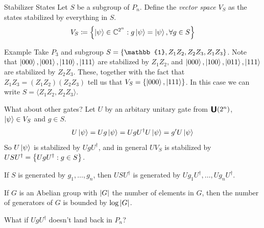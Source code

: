 \documentclass[11pt,aspectratio=1610]{beamer}
\newcommand{\unitary}[1]{\raisebox{-1pt}{\scalebox{1.2}{$\bm{\mathsf{U}}$}}\qty(#1)}
\begin{document}
\begin{frame}{Stabilizer States}
	Let $S$ be a subgroup of $P_n$. Define the \emph{vector space} $V_S$ as the states stabilized by everything in $S$.
	\begin{equation*}
		V_S\coloneqq \qty{\ket{\psi}\in\mathbb{C}^{2^n}: g\ket{\psi} = \ket{\psi}, \forall g\in S}
	\end{equation*}
	\begin{exampleblock}{Example}
		Take $P_3$ and subgroup $S = \qty{\mathbb{1}, Z_1Z_2, Z_2Z_3, Z_1Z_3}$. Note that $\ket{000}, \ket{001}, \ket{110}, \ket{111}$ are stabilized by $Z_1Z_2$, and $\ket{000}, \ket{100}, \ket{011}, \ket{111}$ are stabilized by $Z_2Z_3$. These, together with the fact that $Z_1Z_3 = (Z_1Z_2)(Z_2Z_3)$ tell us that $V_S = \qty{\ket{000}, \ket{111}}$. In this case we can write $S = \langle Z_1Z_2, Z_2Z_3\rangle$.
	\end{exampleblock}
\end{frame}

\begin{frame}[t]{What about other gates?}
	Let $U$ by an arbitary unitary gate from $\unitary{2^n}$, $\ket{\psi}\in V_S$ and $g\in S$.\pause
	\begin{equation*}
		U\ket{\psi} = Ug\ket{\psi} = UgU^\dagger U\ket{\psi} = g'U\ket{\psi}
	\end{equation*}\pause
	So $U\ket{\psi}$ is stabilized by $UgU^\dagger$, and in general $UV_S$ is stabilized by $USU^\dagger = \qty{UgU^\dagger : g\in S}$.

	\begin{corollary}
		If $S$ is generated by $g_1,\ldots, g_n$, then $USU^\dagger$ is generated by $Ug_1U^\dagger,\ldots, Ug_nU^\dagger$.
	\end{corollary}\pause

	If $G$ is an Abelian group with $\abs{G}$ the number of elements in $G$, then the number of generators of $G$ is bounded by $\log\abs{G}$.\pause

	\begin{warning}
		\begin{center}
			What if $UgU^\dagger$ doesn't land back in $P_n$?
		\end{center}
	\end{warning}
\end{frame}
\end{document}
